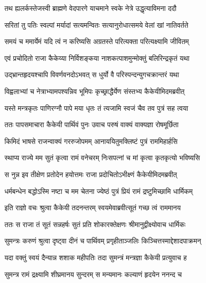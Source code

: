 \twolineshloka
{तथ ह्यलर्कस्तेजस्वी ब्राह्मणे वेदपारगे}
{याचमाने स्वके नेत्रे उद्धृत्याविमना ददौ} %

\twolineshloka
{सरितां तु पतिः स्वल्पां मर्यादां सत्यमन्वितः}
{सत्यानुरोधात्समये वेलां खां नातिवर्तते} %

\twolineshloka
{समयं च ममार्येमं यदि त्वं न करिष्यसि}
{अग्रतस्ते परित्यक्ता परित्यक्ष्यामि जीवितम्} %

\twolineshloka
{एवं प्रचोदितो राजा कैकेय्या निर्विशङ्कया}
{नाशकत्पाशमुन्मोक्तुं बलिरिन्द्रकृतं यथा} %

\twolineshloka
{उद्भ्रान्तहृदयश्चापि विवर्णवनदोऽभवत्}
{स धुर्यो वै परिस्पन्दन्युगचक्रान्तरं यथा} %

\twolineshloka
{विह्वलाभ्यां च नेत्राभ्यामपश्यन्निव भूमिपः}
{कृच्छ्राद्धैर्येण संस्तभ्य कैकेयीमिदमब्रवीत्} %

\twolineshloka
{यस्ते मन्त्रकृतः पाणिरग्नौ पापे मया धृतः}
{तं त्यजामि स्वजं चैव तव पुत्रं सह त्वया} %

\twolineshloka
{ततः पापसमाचारा कैकेयी पार्थिवं पुनः}
{उवाच परुषं वाक्यं वाक्यज्ञा रोषमूर्छिता} %

\twolineshloka
{किमिदं भाषसे राजन्वाक्यं गररुजोपमम्}
{आनाययितुमक्लिष्टं पुत्रं राममिहार्हसि} %

\twolineshloka
{स्थाप्य राज्ये मम सुतं कृत्वा रामं वनेचरम्}
{निःसपत्नां च मां कृत्वा कृतकृत्यो भविष्यसि} %

\twolineshloka
{स नुन्न इव तीक्षेण प्रतोदेन हयोत्तमः}
{राजा प्रदोचितोऽभीक्ष्णं कैकेयीमिदमब्रवीत्} %

\twolineshloka
{धर्मबन्धेन बद्धोऽस्मि नष्टा च मम चेतना}
{ज्येष्ठं पुत्रं प्रियं रामं द्रष्टुमिच्छामि धार्मिकम्} %

\twolineshloka
{इति राज्ञो वचः श्रुत्वा कैकेयी तदनन्तरम्}
{स्वयमेवाब्रवीत्सूतं गच्छ त्वं राममानय} %

\twolineshloka
{ततः स राजा तं सूतं सन्नहर्षः सुतं प्रति}
{शोकारक्तेक्षणः श्रीमानुद्वीक्ष्योवाच धार्मिकः} %

\twolineshloka
{सुमन्त्रः करुणं श्रुत्वा दृष्ट्वा दीनं च पार्थिवम्}
{प्रगृहीताञ्जलिः किञ्चित्तस्माद्देशादपाक्रमन्} %

\twolineshloka
{यदा वक्तुं स्वयं दैन्यान्न शशाक महीपतिः}
{तदा सुमन्त्रं मन्त्रज्ञा कैकेयी प्रत्युवाच ह} %

\twolineshloka
{सुमन्त्र रामं द्रक्ष्यामि शीघ्रमानय सुन्दरम्}
{स मन्यमानः कल्याणं हृदयेन ननन्द च} %

